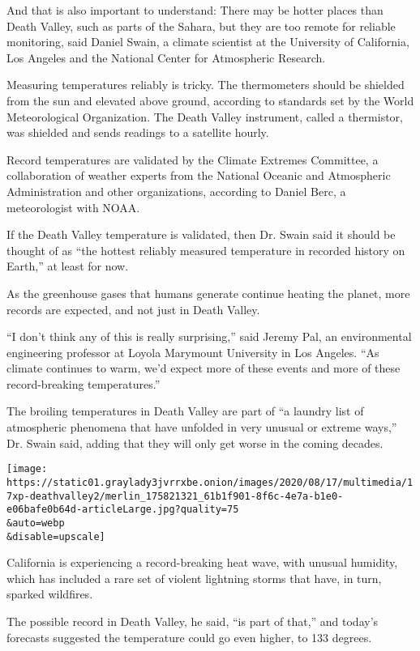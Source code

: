 And that is also important to understand: There may be hotter places
than Death Valley, such as parts of the Sahara, but they are too remote
for reliable monitoring, said Daniel Swain, a climate scientist at the
University of California, Los Angeles and the National Center for
Atmospheric Research.

Measuring temperatures reliably is tricky. The thermometers should be
shielded from the sun and elevated above ground, according to standards
set by the World Meteorological Organization. The Death Valley
instrument, called a thermistor, was shielded and sends readings to a
satellite hourly.

Record temperatures are validated by the Climate Extremes Committee, a
collaboration of weather experts from the National Oceanic and
Atmospheric Administration and other organizations, according to Daniel
Berc, a meteorologist with NOAA.

If the Death Valley temperature is validated, then Dr. Swain said it
should be thought of as ``the hottest reliably measured temperature in
recorded history on Earth,'' at least for now.

As the greenhouse gases that humans generate continue heating the
planet, more records are expected, and not just in Death Valley.

``I don't think any of this is really surprising,'' said Jeremy Pal, an
environmental engineering professor at Loyola Marymount University in
Los Angeles. ``As climate continues to warm, we'd expect more of these
events and more of these record-breaking temperatures.''

The broiling temperatures in Death Valley are part of ``a laundry list
of atmospheric phenomena that have unfolded in very unusual or extreme
ways,'' Dr. Swain said, adding that they will only get worse in the
coming decades.

\texttt{[image: https://static01.graylady3jvrrxbe.onion/images/2020/08/17/multimedia/17xp-deathvalley2/merlin\_175821321\_61b1f901-8f6c-4e7a-b1e0-e06bafe0b64d-articleLarge.jpg?quality=75\\\&auto=webp\\\&disable=upscale]}

California is experiencing a record-breaking heat wave, with unusual
humidity, which has included a rare set of violent lightning storms that
have, in turn, sparked wildfires.

The possible record in Death Valley, he said, ``is part of that,'' and
today's forecasts suggested the temperature could go even higher, to 133
degrees.

